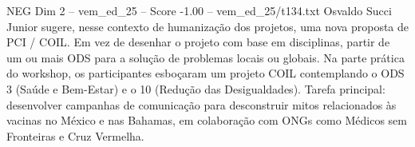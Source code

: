 \begin{textsample}{NEG Dim 2 – vem\_ed\_25 – Score -1.00 – vem\_ed\_25/t134.txt}
Osvaldo Succi Junior sugere, nesse contexto de humanização dos projetos, uma nova proposta de PCI / COIL.
Em vez de desenhar o projeto com base em disciplinas, partir de um ou mais ODS para a solução de problemas locais ou globais.
Na parte prática do workshop, os participantes esboçaram um projeto COIL contemplando o ODS 3 (Saúde e Bem-Estar) e o 10 (Redução das Desigualdades).
Tarefa principal: desenvolver campanhas de comunicação para desconstruir mitos relacionados às vacinas no México e nas Bahamas, em colaboração com ONGs como Médicos sem Fronteiras e Cruz Vermelha.

\end{textsample}

